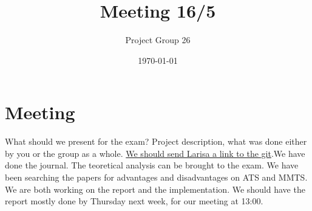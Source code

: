\documentclass{article}
\title{Meeting 16/5}
\author{Project Group 26}
\date{\today}
\begin{document}
\maketitle

\section{Meeting}

What should we present for the exam? Project description, what was done either by you or the group as a whole. \underline{We should send Larisa a link to the git}.We have done the journal. The teoretical analysis can be brought to the exam. We have been searching the papers for advantages and disadvantages on ATS and MMTS. We are both working on the report and the implementation. We should have the report mostly done by Thursday next week, for our meeting at 13:00.
\end{document}
